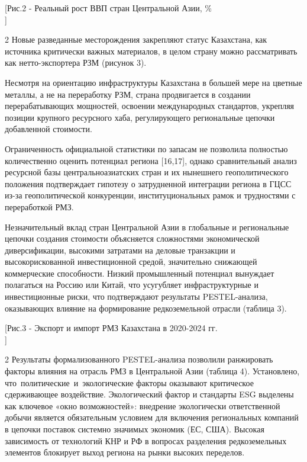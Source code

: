 [Рис.2 - Реальный рост ВВП стран Центральной Азии, \%\\]

\begin{multicols}{2}
Новые разведанные месторождения закрепляют статус Казахстана, как
источника критически важных материалов, в целом страну можно
рассматривать как нетто-экспортера РЗМ (рисунок 3).

Несмотря на ориентацию инфраструктуры Казахстана в большей мере на
цветные металлы, а не на переработку РЗМ, страна продвигается в создании
перерабатывающих мощностей, освоении международных стандартов, укрепляя
позиции крупного ресурсного хаба, регулирующего региональные цепочки
добавленной стоимости.

Ограниченность официальной статистики по запасам не позволила полностью
количественно оценить потенциал региона {[}16,17{]}, однако
сравнительный анализ ресурсной базы центральноазиатских стран и их
нынешнего геополитического положения подтверждает гипотезу о
затрудненной интеграции региона в ГЦСС из-за геополитической
конкуренции, институциональных рамок и трудностями с переработкой РМЗ.

Незначительный вклад стран Центральной Азии в глобальные и региональные
цепочки создания стоимости объясняется сложностями экономической
диверсификации, высокими затратами на деловые транзакции и
высокорискованной инвестиционной средой, значительно снижающей
коммерческие способности. Низкий промышленный потенциал вынуждает
полагаться на Россию или Китай, что усугубляет инфраструктурные и
инвестиционные риски, что подтверждают результаты PESTEL-анализа,
оказывающих влияние на формирование редкоземельной отрасли (таблица 3).
\end{multicols}

[Рис.3 - Экспорт и импорт РМЗ Казахстана в 2020-2024 гг.\\]

\begin{multicols}{2}
Результаты формализованного PESTEL-анализа позволили ранжировать факторы
влияния на отрасль РМЗ в Центральной Азии (таблица 4). Установлено,
что~политические~и~экологические факторы оказывают критическое
сдерживающее воздействие. Экологический фактор и стандарты ESG выделены
как ключевое «окно возможностей»: внедрение экологически ответственной
добычи является обязательным условием для включения региональных
компаний в цепочки поставок системно значимых экономик (ЕС, США).
Высокая зависимость от технологий КНР и РФ в вопросах разделения
редкоземельных элементов блокирует выход региона на рынки высоких
переделов.
\end{multicols}

